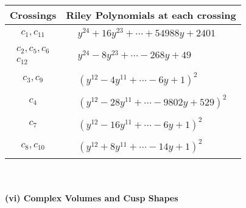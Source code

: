 \documentclass[1p]{elsarticle_modified}
\theoremstyle{definition}
\begin{document}
\begin{tabular}{m{50pt}|m{274pt}}
Crossings & \hspace{64pt}Riley Polynomials at each crossing \\
\hline $$\begin{aligned}c_{1},c_{11}\end{aligned}$$&$\begin{aligned}
&y^{24}+16 y^{23}+\cdots+54988 y+2401
\end{aligned}$\\
\hline $$\begin{aligned}c_{2},c_{5},c_{6}\\c_{12}\end{aligned}$$&$\begin{aligned}
&y^{24}-8 y^{23}+\cdots-268 y+49
\end{aligned}$\\
\hline $$\begin{aligned}c_{3},c_{9}\end{aligned}$$&$\begin{aligned}
&(y^{12}-4 y^{11}+\cdots-6 y+1)^{2}
\end{aligned}$\\
\hline $$\begin{aligned}c_{4}\end{aligned}$$&$\begin{aligned}
&(y^{12}-28 y^{11}+\cdots-9802 y+529)^{2}
\end{aligned}$\\
\hline $$\begin{aligned}c_{7}\end{aligned}$$&$\begin{aligned}
&(y^{12}-16 y^{11}+\cdots-6 y+1)^{2}
\end{aligned}$\\
\hline $$\begin{aligned}c_{8},c_{10}\end{aligned}$$&$\begin{aligned}
&(y^{12}+8 y^{11}+\cdots-14 y+1)^{2}
\end{aligned}$\\
\hline
\end{tabular}\\~\\
\newpage\flushleft \textbf{(vi) Complex Volumes and Cusp Shapes}
\end{document}
